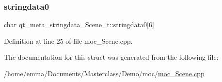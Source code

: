 \subsubsection{\texorpdfstring{stringdata0}{stringdata0}}
{\footnotesize\ttfamily char qt\+\_\+meta\+\_\+stringdata\+\_\+\+Scene\+\_\+t\+::stringdata0\mbox{[}6\mbox{]}}



Definition at line 25 of file moc\+\_\+\+Scene.\+cpp.



The documentation for this struct was generated from the following file\+:\begin{DoxyCompactItemize}
\item 
/home/emma/\+Documents/\+Masterclass/\+Demo/moc/\mbox{\hyperlink{moc___scene_8cpp}{moc\+\_\+\+Scene.\+cpp}}\end{DoxyCompactItemize}
